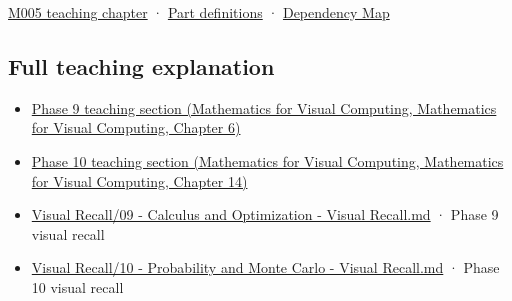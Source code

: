 \hyperref[01-foundations-i-ch001-when-arithmetic-meets-uncertainty]{M005 teaching chapter} · \hyperref[appendix-fd090d982a15-m005---parts-77-88]{Part definitions} · \hyperref[appendix-4ad47bdd269a]{Dependency Map}

\subsection{Full teaching explanation}\label{appendix-3ae74e89b4e6-full-teaching-explanation}

\begin{itemize}
\tightlist
\item
  \href{../02-Mathematics-for-Visual-Computing/main.pdf\#nameddest=02-foundations-ii-ch022-numerical-differentiation-and-automatic-differentiation}{Phase 9 teaching section (Mathematics for Visual Computing, Mathematics for Visual Computing, Chapter 6)}
\item
  \href{../02-Mathematics-for-Visual-Computing/main.pdf\#nameddest=02-foundations-ii-ch030-inference-and-error-metrics-need-explicit-assumptions}{Phase 10 teaching section (Mathematics for Visual Computing, Mathematics for Visual Computing, Chapter 14)}
\item
  \hyperref[appendix-adf48f5dc5c1]{Visual Recall/09 - Calculus and Optimization - Visual Recall.md} · Phase 9 visual recall
\item
  \hyperref[appendix-cb5af353ef77]{Visual Recall/10 - Probability and Monte Carlo - Visual Recall.md} · Phase 10 visual recall
\end{itemize}
